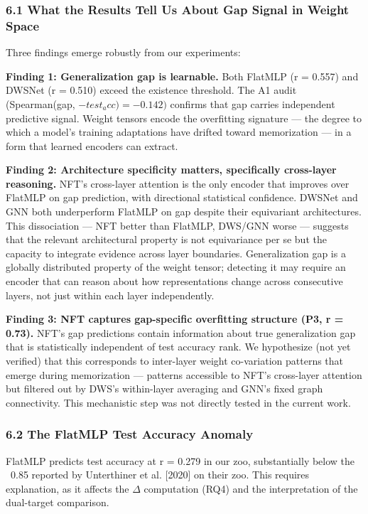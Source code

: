 
\subsubsection{6.1 What the Results Tell Us About Gap Signal in Weight Space}

Three findings emerge robustly from our experiments:

\textbf{Finding 1: Generalization gap is learnable.} Both FlatMLP (r = 0.557) and DWSNet (r = 0.510)
exceed the existence threshold. The A1 audit (Spearman(gap, $-test_acc) = -0.142)$ confirms that
gap carries independent predictive signal. Weight tensors encode the overfitting signature --- the
degree to which a model's training adaptations have drifted toward memorization --- in a form that
learned encoders can extract.

\textbf{Finding 2: Architecture specificity matters, specifically cross-layer reasoning.} NFT's cross-layer
attention is the only encoder that improves over FlatMLP on gap prediction, with directional
statistical confidence. DWSNet and GNN both underperform FlatMLP on gap despite their equivariant
architectures. This dissociation --- NFT better than FlatMLP, DWS/GNN worse --- suggests that the
relevant architectural property is not equivariance per se but the capacity to integrate evidence
across layer boundaries. Generalization gap is a globally distributed property of the weight tensor;
detecting it may require an encoder that can reason about how representations change across consecutive
layers, not just within each layer independently.

\textbf{Finding 3: NFT captures gap-specific overfitting structure (P3, r = 0.73).} NFT's gap predictions
contain information about true generalization gap that is statistically independent of test accuracy
rank. We hypothesize (not yet verified) that this corresponds to inter-layer weight co-variation
patterns that emerge during memorization --- patterns accessible to NFT's cross-layer attention but
filtered out by DWS's within-layer averaging and GNN's fixed graph connectivity. This mechanistic
step was not directly tested in the current work.

\subsubsection{6.2 The FlatMLP Test Accuracy Anomaly}

FlatMLP predicts test accuracy at r = 0.279 in our zoo, substantially below the ~0.85 reported by
Unterthiner et al. [2020] on their zoo. This requires explanation, as it affects the $\Delta$ computation
(RQ4) and the interpretation of the dual-target comparison.

